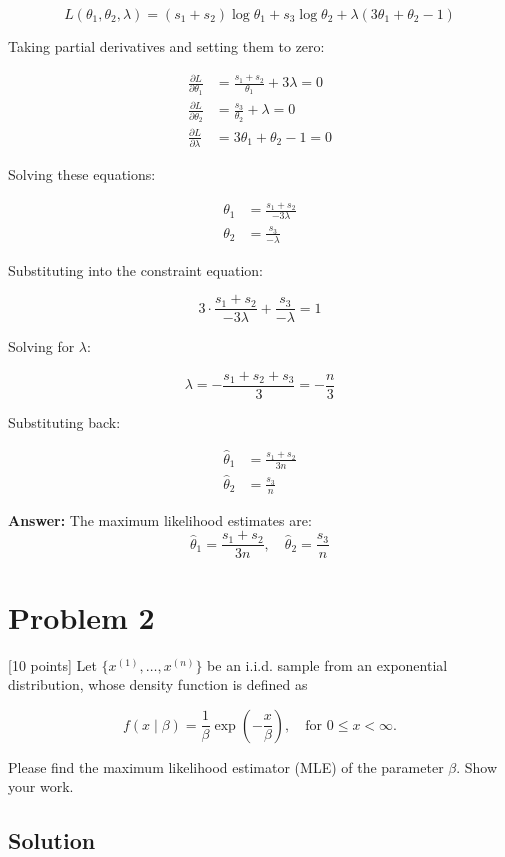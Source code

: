 \documentclass{article}
\begin{document}
\[ L(\theta_1, \theta_2, \lambda) = (s_1 + s_2) \log \theta_1 + s_3 \log \theta_2 + \lambda(3\theta_1 + \theta_2 - 1) \]

Taking partial derivatives and setting them to zero:

\begin{align*}
\frac{\partial L}{\partial \theta_1} &= \frac{s_1 + s_2}{\theta_1} + 3\lambda = 0 \\
\frac{\partial L}{\partial \theta_2} &= \frac{s_3}{\theta_2} + \lambda = 0 \\
\frac{\partial L}{\partial \lambda} &= 3\theta_1 + \theta_2 - 1 = 0
\end{align*}

Solving these equations:

\begin{align*}
\theta_1 &= \frac{s_1 + s_2}{-3\lambda} \\
\theta_2 &= \frac{s_3}{-\lambda}
\end{align*}

Substituting into the constraint equation:

\[ 3 \cdot \frac{s_1 + s_2}{-3\lambda} + \frac{s_3}{-\lambda} = 1 \]

Solving for $\lambda$:

\[ \lambda = -\frac{s_1 + s_2 + s_3}{3} = -\frac{n}{3} \]

Substituting back:

\begin{align*}
\hat{\theta}_1 &= \frac{s_1 + s_2}{3n} \\
\hat{\theta}_2 &= \frac{s_3}{n}
\end{align*}

\textbf{Answer:}
The maximum likelihood estimates are:
\[ \hat{\theta}_1 = \frac{s_1 + s_2}{3n}, \quad \hat{\theta}_2 = \frac{s_3}{n} \]

\section*{Problem 2}

[10 points] Let $\{x^{(1)},\ldots,x^{(n)}\}$ be an i.i.d. sample from an exponential distribution, whose density function is defined as

\[
f(x \mid \beta) = \frac{1}{\beta} \exp \left(-\frac{x}{\beta}\right), \quad \text{for } 0 \leq x < \infty.
\]

Please find the maximum likelihood estimator (MLE) of the parameter $\beta$. Show your work.

\subsection*{Solution}
\end{document}
